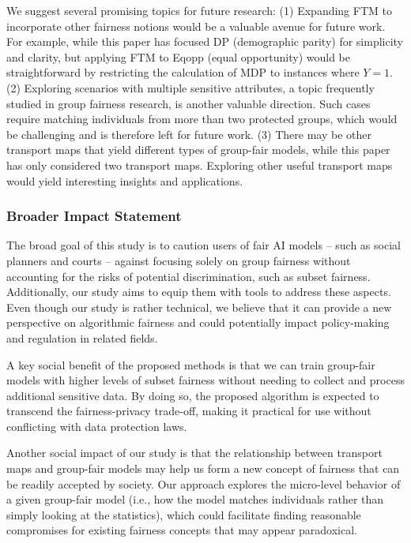 \documentclass[10pt]{article} %
\begin{document}
We suggest several promising topics for future research:
(1) Expanding FTM to incorporate other fairness notions would be a valuable avenue for future work.
For example, while this paper has focused DP (demographic parity) for simplicity and clarity, but applying FTM to Eqopp (equal opportunity) would be straightforward by restricting the calculation of MDP to instances where $Y=1.$
(2) Exploring scenarios with multiple sensitive attributes, a topic frequently studied in group fairness research, is another valuable direction.
Such cases require matching individuals from more than two protected groups, which would be challenging and is therefore left for future work.
(3) There may be other transport maps that yield different types of group-fair models, while this paper has only considered two transport maps.
Exploring other useful transport maps would yield interesting insights and applications.

\subsubsection*{Broader Impact Statement}
The broad goal of this study is to caution users of fair AI models -- such as social planners and courts -- against focusing solely on group fairness without accounting for the risks of potential discrimination, such as subset fairness.
Additionally, our study aims to equip them with tools to address these aspects.
Even though our study is rather technical, we believe that it can provide a new perspective on algorithmic fairness and could potentially impact policy-making and regulation in related fields.

A key social benefit of the proposed methods is that we can train group-fair models with higher levels of subset fairness without needing to collect and process additional sensitive data.
By doing so, the proposed algorithm is expected to transcend the fairness-privacy trade-off, making it practical for use without conflicting with data protection laws.

Another social impact of our study is that the relationship between transport maps and group-fair models may help us form a new concept of fairness that can be readily accepted by society.
Our approach explores the micro-level behavior of a given group-fair model (i.e., how the model matches individuals rather than simply looking at the statistics), which could facilitate finding reasonable compromises for existing fairness concepts that may appear paradoxical.
\end{document}
